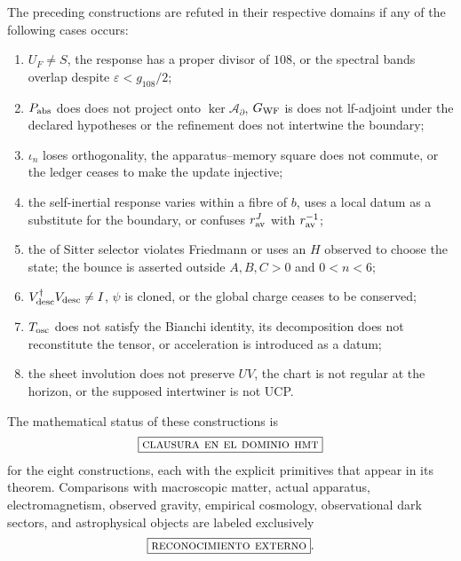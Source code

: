 The preceding constructions are refuted in their respective domains
if any of the following cases occurs:

\begin{enumerate}
 \setlength{\itemsep}{0.15\baselineskip}
 \item \(U_F\neq S\), the response has a proper divisor of \(108\), or the
 spectral bands overlap despite \(\varepsilon<g_{108}/2\);
 \item \(P_{\rm abs}\) does does not project onto
 \(\ker\mathcal A_\partial\), \(G_{\rm WF}\) is does not lf-adjoint under the
 declared hypotheses or the refinement does not intertwine the boundary;
 \item \(\iota_n\) loses orthogonality, the apparatus--memory square does not
 commute, or the ledger ceases to make the update injective;
 \item the self-inertial response varies within a fibre of \(b\), uses a
 local datum as a substitute for the boundary, or confuses
 \(r_{\rm av}^J\) with \(r_{\rm av}^{-1}\);
 \item the of Sitter selector violates Friedmann or uses an \(H\) observed
 to choose the state; the bounce is asserted outside
 \(A,B,C>0\) and \(0<n<6\);
 \item \(V_{\rm desc}^{\dagger}V_{\rm desc}\neq I\), \(\psi\) is cloned, or
the global charge ceases to be conserved;
 \item \(T_{\rm osc}\) does not satisfy the Bianchi identity, its
 decomposition does not reconstitute the tensor, or acceleration is introduced as
 a datum;
 \item the sheet involution does not preserve \(UV\), the chart is not regular at
 the horizon, or the supposed intertwiner is not UCP.
\end{enumerate}


The mathematical status of these constructions is
\[
 \boxed{\textsc{clausura en el dominio hmt}}
\]
for the eight constructions, each with the explicit primitives that
appear in its theorem. Comparisons with macroscopic matter, actual
apparatus, electromagnetism, observed gravity, empirical cosmology, observational
dark sectors, and astrophysical objects are labeled exclusively
\[
 \boxed{\textsc{reconocimiento externo}}.
\]
